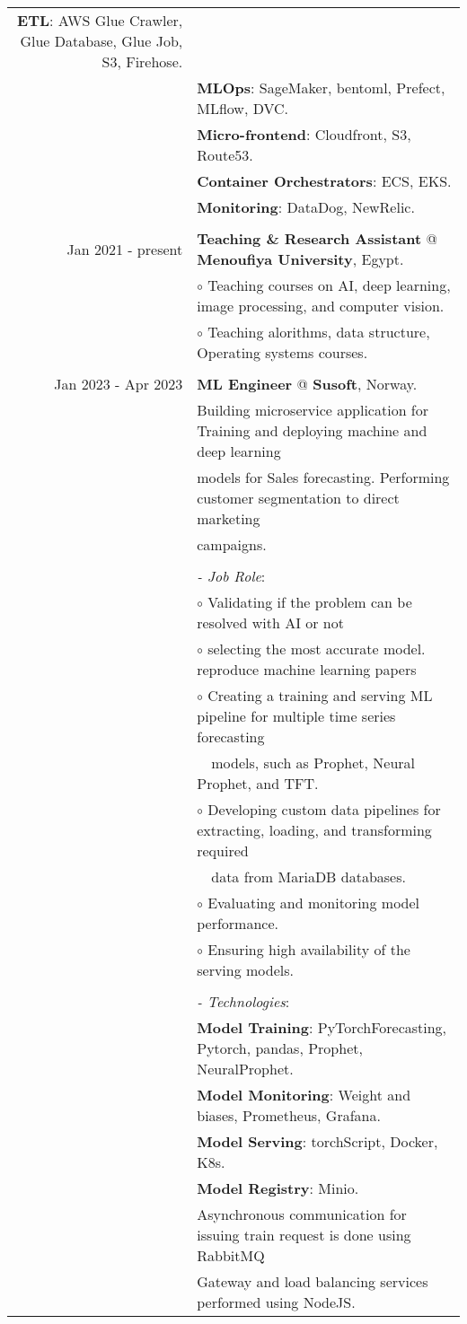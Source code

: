 \documentclass[a4paper,10pt]{article}
\begin{document}
\begin{longtable}{r|l}
    \textbf{ETL}: AWS Glue Crawler, Glue Database, Glue Job, S3, Firehose. \\&
    \textbf{MLOps}: SageMaker, bentoml, Prefect, MLflow, DVC. \\&
    \textbf{Micro-frontend}: Cloudfront, S3, Route53. \\&
    \textbf{Container Orchestrators}: ECS, EKS. \\&
    \textbf{Monitoring}: DataDog, NewRelic. \\&
    \\
    Jan 2021 - present & \textbf{Teaching \& Research Assistant} @ 
    \textbf{Menoufiya University}, Egypt. \\&
    $\circ$ Teaching courses on AI, deep learning, image processing, and computer vision. \\&
    $\circ$ Teaching alorithms, data structure, Operating systems courses. \\&
    \\
    Jan 2023 - Apr 2023 & \textbf{ML Engineer} @
    \textbf{Susoft}, Norway. \\& 
    Building microservice application for Training and deploying machine and deep learning \\& models for Sales forecasting. 
    Performing customer segmentation to direct marketing \\& campaigns. \\&
    \\&
    \textit{- Job Role}:\\&
    $\circ$ Validating if the problem can be resolved with AI or not \\&
    $\circ$ selecting the most accurate model. reproduce machine learning papers \\&
    $\circ$ Creating a training and serving ML pipeline for multiple time series 
    forecasting \\& ~~models, such as Prophet, Neural Prophet, and TFT. \\&
    $\circ$ Developing custom data pipelines for extracting, loading, and transforming  
    required \\& ~~data from MariaDB databases. \\&
    $\circ$ Evaluating and monitoring model performance. \\&
    $\circ$ Ensuring high availability of the serving models. \\&
    \\&
    \textit{- Technologies}:\\&
     \textbf{Model Training}: PyTorchForecasting, Pytorch, pandas, Prophet, NeuralProphet. \\&
     \textbf{Model Monitoring}: Weight and biases, Prometheus, Grafana.\\&
     \textbf{Model Serving}: torchScript, Docker, K8s. \\&
     \textbf{Model Registry}: Minio. \\&
    Asynchronous communication for issuing train request is done using RabbitMQ \\&
    Gateway and load balancing services performed using NodeJS.
\end{longtable}
\end{document}
